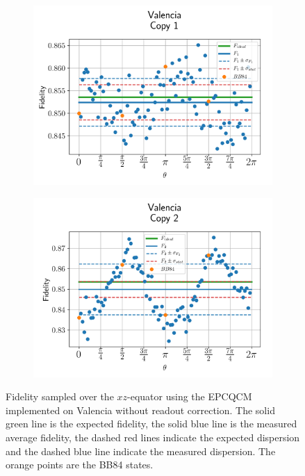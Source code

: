 \begin{figure}[H]
  \centering
  \begin{subfigure}{.5\textwidth}
    \centering
    \includegraphics[width=\textwidth]{Figures/Economical/IBM/OnlyEquator/results_valencia_copy1.png}
    \label{fig:epc_uncorrected_valencia_equator_1}
  \end{subfigure}%
  \begin{subfigure}{.5\textwidth}
    \centering
    \includegraphics[width=\textwidth]{Figures/Economical/IBM/OnlyEquator/results_valencia_copy2.png}
    \label{fig:epc_uncorrected_valencia_equator_2}
  \end{subfigure}
  \vspace{-0.5cm}
  \caption{Fidelity sampled over the $xz$-equator using the EPCQCM implemented on Valencia without readout correction. The solid green line is the expected fidelity, the solid blue line is the measured average fidelity, the dashed red lines indicate the expected dispersion and the dashed blue line indicate the measured dispersion. The orange points are the BB84 states.}
  \label{fig:epc_uncorrected_valencia_equator}
\end{figure}

